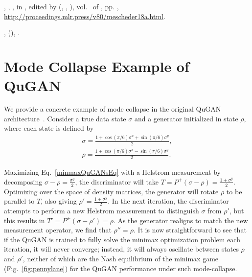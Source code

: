 \documentclass[prl,superscriptaddress,twocolumn]{revtex4}
\theoremstyle{plain}
\theoremstyle{definition}
\begin{document}
\begin{thebibliography}{25}
,
  , 
  , in
  \emph{}, edited by
   
  (, , ), vol.~ of
  \emph{}, pp.
  ,
  \urlprefix\url{http://proceedings.mlr.press/v80/mescheder18a.html}.

,
  \emph{} (),
  .

\end{thebibliography}


\clearpage
\appendix
\section{Mode Collapse Example of QuGAN}
We provide a concrete example of mode collapse in the original QuGAN architecture~\cite{PhysRevA.98.012324,Lloyd2018}. Consider a true data state $\sigma$ and a generator initialized in state $\rho$, where each state is defined by
\begin{align}
\label{modecollapseTargetEq}
\sigma = \frac{1 + \cos(\pi/6)\sigma^x + \sin(\pi/6)\sigma^y}{2},\\
\label{modecollapseGeneratorEq}
    \rho=\frac{1 + \cos(\pi/6)\sigma^x - \sin(\pi/6)\sigma^y}{2}.
\end{align}

Maximizing Eq.~\ref{minmaxQuGANsEq} with a Helstrom measurement by decomposing $\sigma - \rho = \frac{\sigma^y}{2}$, the discriminator will take $T = P^+(\sigma-\rho) = \frac{1+\sigma^y}{2}$. Optimizing over the space of density matrices, the generator will rotate $\rho$ to be parallel to $T$, also giving $\rho' = \frac{1+\sigma^y}{2}$. In the next iteration, the discriminator attempts to perform a new Helstrom measurement to distinguish $\sigma$ from $\rho'$, but this results in $T' = P^+(\sigma - \rho') = \rho$. As the generator realigns to match the new measurement operator, we find that $\rho'' = \rho$. It is now straightforward to see that if the QuGAN is trained to fully solve the minimax optimization problem each iteration, it will never converge; instead, it will always oscillate between states $\rho$ and $\rho'$, neither of which are the Nash equilibrium of the minimax game (Fig.~\ref{fig:pennylane}) for the QuGAN performance under such mode-collapse.
\end{document}
